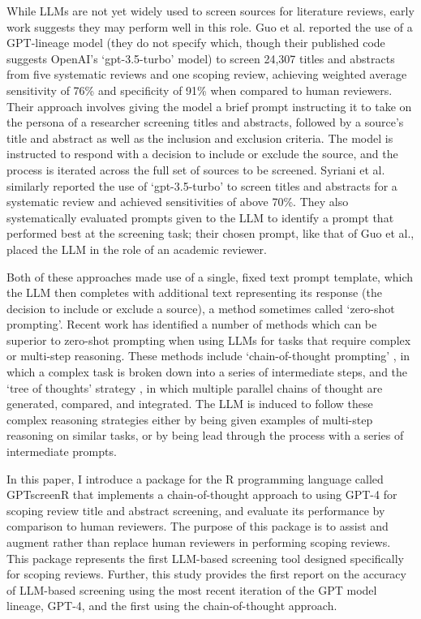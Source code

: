 \documentclass[10pt,a4paper,twocolumn]{article}
\begin{document}
While LLMs are not yet widely used to screen sources for literature reviews, early work suggests they may perform well in this role. Guo et al. \cite{Guo.2023} reported the use of a GPT-lineage model (they do not specify which, though their published code suggests OpenAI's `gpt-3.5-turbo' model) to screen 24,307 titles and abstracts from five systematic reviews and one scoping review, achieving weighted average sensitivity of 76\% and specificity of 91\% when compared to human reviewers. Their approach involves giving the model a brief prompt instructing it to take on the persona of a researcher screening titles and abstracts, followed by a source's title and abstract as well as the inclusion and exclusion criteria. The model is instructed to respond with a decision to include or exclude the source, and the process is iterated across the full set of sources to be screened. Syriani et al. \cite{Syriani.2023} similarly reported the use of `gpt-3.5-turbo' to screen titles and abstracts for a systematic review and achieved sensitivities of above 70\%. They also systematically evaluated prompts given to the LLM to identify a prompt that performed best at the screening task; their chosen prompt, like that of Guo et al., placed the LLM in the role of an academic reviewer.

Both of these approaches made use of a single, fixed text prompt template, which the LLM then completes with additional text representing its response (the decision to include or exclude a source), a method sometimes called `zero-shot prompting'. Recent work has identified a number of methods which can be superior to zero-shot prompting when using LLMs for tasks that require complex or multi-step reasoning. These methods include `chain-of-thought prompting' \cite{Wei.2022}, in which a complex task is broken down into a series of intermediate steps, and the `tree of thoughts' strategy \cite{Yao.2023}, in which multiple parallel chains of thought are generated, compared, and integrated. The LLM is induced to follow these complex reasoning strategies either by being given examples of multi-step reasoning on similar tasks, or by being lead through the process with a series of intermediate prompts.

In this paper, I introduce a package for the R programming language \cite{R.2023} called GPTscreenR that implements a chain-of-thought approach to using GPT-4 for scoping review title and abstract screening, and evaluate its performance by comparison to human reviewers. The purpose of this package is to assist and augment rather than replace human reviewers in performing scoping reviews. This package represents the first LLM-based screening tool designed specifically for scoping reviews. Further, this study provides the first report on the accuracy of LLM-based screening using the most recent iteration of the GPT model lineage, GPT-4, and the first using the chain-of-thought approach.
\end{document}
